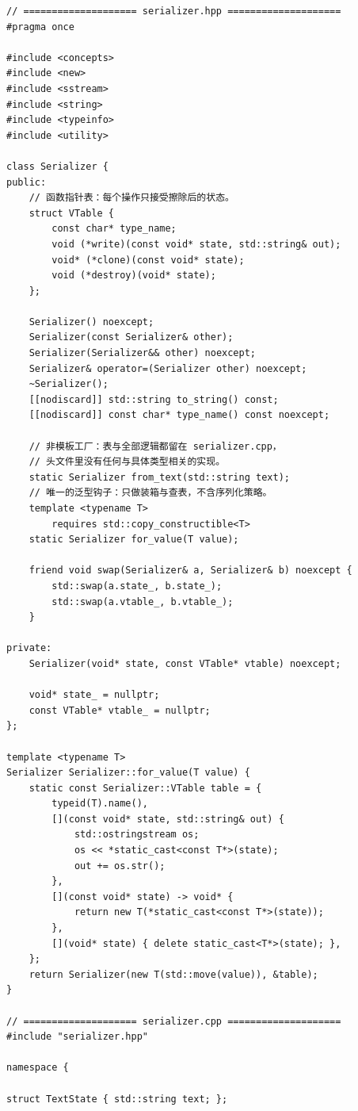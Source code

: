 \documentclass[12pt,a4paper,fontset=fandol]{ctexbook}
\begin{document}
\begin{lstlisting}[style=cppstyle,caption={手写函数指针表加擦除状态指针的类型擦除示例}]
// ==================== serializer.hpp ====================
#pragma once

#include <concepts>
#include <new>
#include <sstream>
#include <string>
#include <typeinfo>
#include <utility>

class Serializer {
public:
    // 函数指针表：每个操作只接受擦除后的状态。
    struct VTable {
        const char* type_name;
        void (*write)(const void* state, std::string& out);
        void* (*clone)(const void* state);
        void (*destroy)(void* state);
    };

    Serializer() noexcept;
    Serializer(const Serializer& other);
    Serializer(Serializer&& other) noexcept;
    Serializer& operator=(Serializer other) noexcept;
    ~Serializer();
    [[nodiscard]] std::string to_string() const;
    [[nodiscard]] const char* type_name() const noexcept;

    // 非模板工厂：表与全部逻辑都留在 serializer.cpp，
    // 头文件里没有任何与具体类型相关的实现。
    static Serializer from_text(std::string text);
    // 唯一的泛型钩子：只做装箱与查表，不含序列化策略。
    template <typename T>
        requires std::copy_constructible<T>
    static Serializer for_value(T value);

    friend void swap(Serializer& a, Serializer& b) noexcept {
        std::swap(a.state_, b.state_);
        std::swap(a.vtable_, b.vtable_);
    }

private:
    Serializer(void* state, const VTable* vtable) noexcept;

    void* state_ = nullptr;
    const VTable* vtable_ = nullptr;
};

template <typename T>
Serializer Serializer::for_value(T value) {
    static const Serializer::VTable table = {
        typeid(T).name(),
        [](const void* state, std::string& out) {
            std::ostringstream os;
            os << *static_cast<const T*>(state);
            out += os.str();
        },
        [](const void* state) -> void* {
            return new T(*static_cast<const T*>(state));
        },
        [](void* state) { delete static_cast<T*>(state); },
    };
    return Serializer(new T(std::move(value)), &table);
}

// ==================== serializer.cpp ====================
#include "serializer.hpp"

namespace {

struct TextState { std::string text; };


\end{lstlisting}
\end{document}
